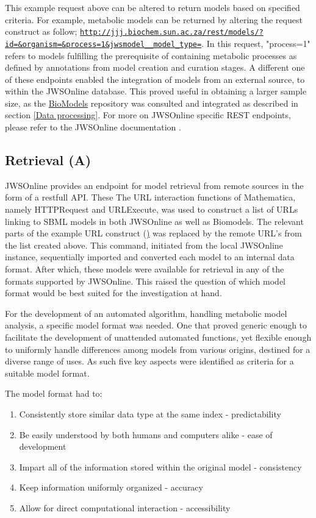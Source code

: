 This example request above can be altered to return models based on specified criteria. For example, metabolic models can be returned by altering the request construct as follow; \href{http://jjj.biochem.sun.ac.za/rest/models/?id=&organism=&process=1&jwsmodel__model_type=}{\nolinkurl{http://jjj.biochem.sun.ac.za/rest/models/?id=\&organism=\&process=1\&jwsmodel\_\_model\_type=}}. In this request, "process=1" refers to models fulfilling the prerequisite of containing metabolic processes as defined by annotations from model creation and curation stages. A different one of these endpoints enabled the integration of models from an external source, to within the JWSOnline database. This proved useful in obtaining a larger sample size, as the \href{https://www.ebi.ac.uk/biomodels-main/}{BioModels} repository was consulted and integrated as described in section \ref{Data processing}. For more on JWSOnline specific REST endpoints, please refer to the JWSOnline documentation \cite{jwsdocs}. 


\subsection{Retrieval (A)} \label{Retrieval}
JWSOnline provides an endpoint for model retrieval from remote sources in the form of a restfull API. These The URL interaction functions of Mathematica, namely HTTPRequest and URLExecute, was used to construct a list of URLs linking to SBML models in both JWSOnline as well as Biomodels. The relevant parts of the example URL construct (\href{http://jjj.bio.vu.nl/rest/fetch/?type={type}&redirect={redirect}&remote={remote}}) was replaced by the remote URL's from the list created above. This command, initiated from the local JWSOnline instance, sequentially imported and converted each model to an internal data format. After which, these models were available for retrieval in any of the formats supported by JWSOnline. This raised the question of which model format would be best suited for the investigation at hand.

For the development of an automated algorithm, handling metabolic model analysis, a specific model format was needed. One that proved generic enough to facilitate the development of unattended automated functions, yet flexible enough to uniformly handle differences among models from various origins, destined for a diverse range of uses. As such five key aspects were identified as criteria for a suitable model format.

The model format had to: 
\begin{enumerate} \label{modelFormat}
  \item Consistently store similar data type at the same index - predictability
  \item Be easily understood by both humans and computers alike - ease of development
  \item Impart all of the information stored within the original model - consistency
  \item Keep information uniformly organized - accuracy
  \item Allow for direct computational interaction - accessibility
\end{enumerate}


